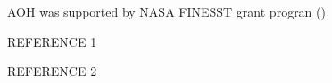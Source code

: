 \documentclass[tc, manuscript]{copernicus}
\begin{document}


\appendixfigures  %

\appendixtables   %





\begin{acknowledgements}
AOH was supported by NASA FINESST grant progran ()
\end{acknowledgements}






\begin{thebibliography}{}

REFERENCE 1

REFERENCE 2

\end{thebibliography}



\end{document}
